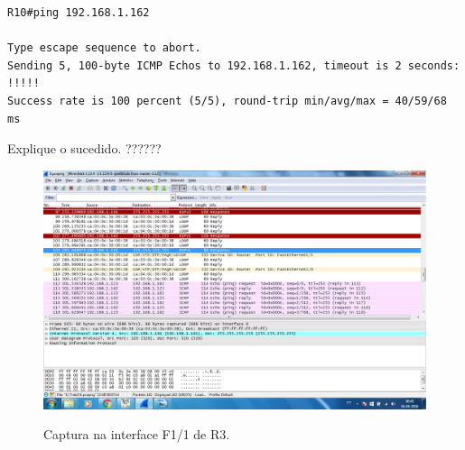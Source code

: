 \begin{verbatim}
R10#ping 192.168.1.162

Type escape sequence to abort.
Sending 5, 100-byte ICMP Echos to 192.168.1.162, timeout is 2 seconds:
!!!!!
Success rate is 100 percent (5/5), round-trip min/avg/max = 40/59/68 ms
\end{verbatim}

Explique o sucedido.     ??????

\begin{figure}[h]
\centering
\includegraphics[width=1\textwidth, height=0.45\textheight]{8.png}
\label{fig:captura}
\caption{Captura na interface F1/1 de \textsf{R3}.}
\end{figure}